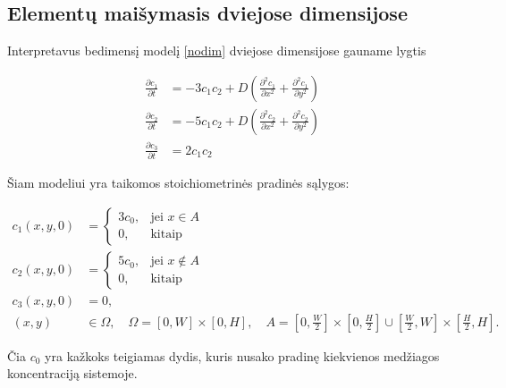 \documentclass{VUMIFInfKursinis}
\begin{document}
\subsection{Elementų maišymasis dviejose dimensijose}

Interpretavus bedimensį modelį \eqref{nodim} dviejose dimensijose gauname lygtis

\begin{subequations} \label{rect}
    \begin{align}
    \frac{\partial c_1}{\partial t}&=-3c_1c_2+D\left(\frac{\partial^2c_1}{\partial x^2}+\frac{\partial^2c_1}{\partial y^2}\right)\\
    \frac{\partial c_2}{\partial t}&=-5c_1c_2+D\left(\frac{\partial^2c_2}{\partial x^2}+\frac{\partial^2c_2}{\partial y^2}\right)\\
    \frac{\partial c_3}{\partial t}&=2c_1c_2
    \end{align}
\end{subequations}

\newpage
Šiam modeliui yra taikomos stoichiometrinės pradinės sąlygos:


\begin{equation} \label{intial-cond}
  \begin{aligned}
  c_1(x, y, 0) &= \begin{cases} 3c_0, & \text{jei } x \in A \\ 0, & \text{kitaip} \end{cases}\\
  c_2(x, y, 0) &= \begin{cases} 5c_0, & \text{jei } x \notin A \\ 0, & \text{kitaip} \end{cases}\\
  c_3(x, y, 0) &= 0,\\ 
  (x, y) &\in \Omega, \quad\Omega=[0,W]\times[0,H],\quad A=\left[0,\tfrac{W}{2}\right]\times\left[0,\tfrac{H}{2}\right] \cup \left[\tfrac{W}{2},W\right]\times\left[\tfrac{H}{2},H\right].
\end{aligned}
\end{equation}

Čia $c_0$ yra kažkoks teigiamas dydis, kuris nusako pradinę kiekvienos medžiagos koncentraciją sistemoje.
\end{document}

